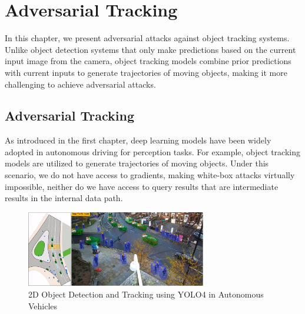 \chapter{Adversarial Tracking}
\label{chpt:tracking}


In this chapter, we present adversarial attacks against object tracking systems. Unlike object detection systems that only make predictions based on the current input image from the camera, object tracking models combine prior predictions with current inputs to generate trajectories of moving objects, making it more challenging to achieve adversarial attacks.

\section{Adversarial Tracking}
\label{sec:adv_track}

As introduced in the first chapter, deep learning models have been widely adopted in autonomous driving for perception tasks. For example, object tracking models are utilized to generate trajectories of moving objects. Under this scenario, we do not have access to gradients, making white-box attacks virtually impossible, neither do we have access to query results that are intermediate results in the internal data path.

\begin{figure}[b]
\centering
\includegraphics[width=0.7\textwidth]{figures/chapter_tracking/tracking.jpg}
\caption{2D Object Detection and Tracking using YOLO4 in Autonomous Vehicles}
\label{fig.tracking}
\end{figure}


